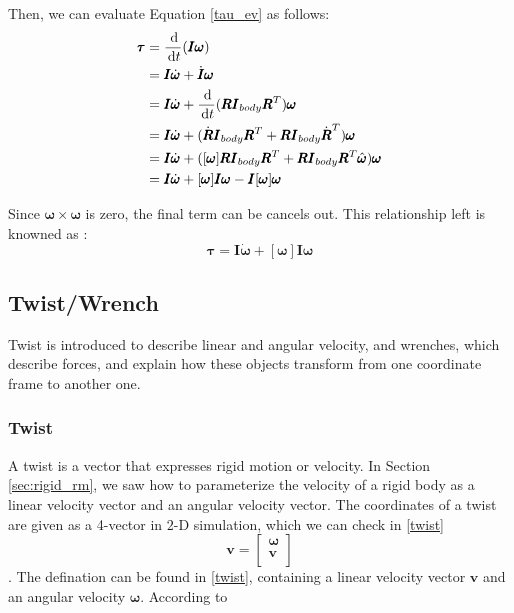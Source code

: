 Then, we can evaluate Equation \ref{tau_ev} as follows:
\begin{equation}
    \begin{aligned}
        \pmb{\tau} &= \frac{\,\mathrm{d}}{\,\mathrm{d} t}(\pmb{I}\pmb{\omega}) \\
        &= \pmb{I}\dot{\pmb{\omega}} + \dot{\pmb{I}}\pmb{\omega} \\
        &= \pmb{I}\dot{\pmb{\omega}} + \frac{\,\mathrm{d}}{\,\mathrm{d} t}(\pmb{R}\pmb{I}_{body}\pmb{R}^{T})\pmb{\omega} \\
        &= \pmb{I}\dot{\pmb{\omega}} + (\dot{\pmb{R}}\pmb{I}_{body}\pmb{R}^{T} + \pmb{R}\pmb{I}_{body}\dot{\pmb{R}}^{T})\pmb{\omega} \\
        &= \pmb{I}\dot{\pmb{\omega}} + ([\pmb{\omega}]\pmb{R}\pmb{I}_{body}\pmb{R}^{T} + \pmb{R}\pmb{I}_{body}\pmb{R}^{T} \hat{\pmb{\omega}})\pmb{\omega} \\
        &= \pmb{I}\dot{\pmb{\omega}} + [\pmb{\omega}]\pmb{I}\pmb{\omega} - \pmb{I}[\pmb{\omega}]\pmb{\omega}
    \end{aligned}
    \label{tau_ev}
\end{equation}

Since $\pmb{\omega} \times \pmb{\omega}$ is zero, the final term can be cancels out. This relationship left is knowned as :
\begin{equation}
    \pmb{\tau} = \pmb{I}\dot{\pmb{\omega}} + [\pmb{\omega}]\pmb{I}\pmb{\omega}
    \label{tau}
\end{equation}

\subsection{Twist/Wrench}
Twist is introduced to describe linear and angular velocity, and wrenches, which describe forces, and explain how these objects transform from one coordinate frame to another one. 
    \subsubsection{Twist} 
        A twist is a vector that expresses rigid motion or velocity. In Section \ref{sec:rigid_rm}, we saw how to parameterize the velocity of a rigid body as a linear velocity vector and an angular velocity vector. The coordinates of a twist are given as a 4-vector in $2$-D simulation, which we can check in \ref{twist}
            \begin{equation}
                \mathbf{v} = \left[ \begin{array}{c} \pmb{\omega} \\ \pmb{v} \\ \end{array} \right]
                \label{twist}
            \end{equation}.
        The defination can be found in \ref{twist}, containing a linear velocity vector \(\pmb{v}\) and an angular velocity \(\pmb{\omega}\). According to 

